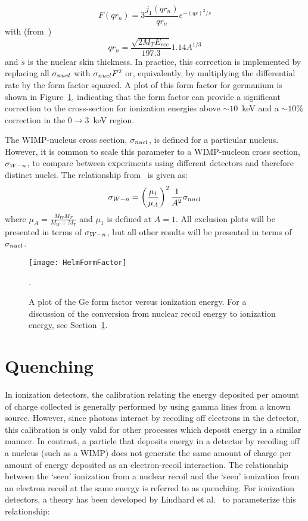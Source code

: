 		\begin{equation}
			F (q r_{n}) = 3 \frac{j_{1}(q r_{n})}{q r_{n}} e^{-(q s)^{2}/s}
			\label{eqn:WSHelmFF}
		\end{equation}
with (from~\cite{Lew96})
		\[
			q r_{n} = \frac{\sqrt{2  M_{T} E_{rec}}}{197.3} 1.14 A^{1/3}
		\]
and $s$ is the nuclear skin thickness.  In practice, this correction is implemented by replacing all $\sigma_{nucl}$ with $\sigma_{nucl} F^{2}$ or, equivalently, by multiplying the differential rate by the form factor squared.  A plot of this form factor for germanium is shown in Figure~\ref{fig:HelmFF}, indicating that the form factor can provide a significant correction to the cross-section for ionization energies above $\sim10$~keV and a $\sim10$\% correction in the 0$\to$3~keV region.  

The WIMP-nucleus cross section, $\sigma_{nucl}$, is defined for a particular nucleus.  However, it is common to scale this parameter to a WIMP-nucleon cross section, $\sigma_{W-n}$, to compare between experiments using different detectors and therefore distinct nuclei.  The relationship from~\cite{Alner2005444} is given as: 
		\begin{equation}
			\sigma_{W-n} = \left( \frac{\mu_{1}}{\mu_{A}} \right)^{2}\frac{1}{A^{2}} \sigma_{nucl} 
			\label{eqn:SigmaConversion}
		\end{equation}
where $\mu_{A} = \frac{M_{W} M_{T}}{M_{W} + M_{T}}$ and $\mu_{1}$ is defined at $A=1$.  All exclusion plots will be presented in terms of $\sigma_{W-n}$, but all other results will be presented in terms of $\sigma_{nucl}$.

		\begin{figure}
			\centering
			\texttt{[image: HelmFormFactor]}
			\caption[A plot of the Ge form factor versus ionization energy]
			{A plot of the Ge form factor versus ionization energy.  For a discussion of the 
			conversion from nuclear recoil energy to ionization energy, see 
			Section~\ref{sec:ResultsQuenching}.}
			\label{fig:HelmFF}.
		\end{figure}
	\section{Quenching}
	\label{sec:ResultsQuenching}
In ionization detectors, the calibration relating the energy deposited per
amount of charge collected is generally performed by using gamma lines from a
known source.  However, since photons interact by recoiling off electrons in
the detector, this calibration is only valid for other processes which deposit
energy in a similar manner.  In contrast, a particle that deposits energy in a
detector by recoiling off a nucleus (such as a WIMP) does not
generate the same amount of charge per amount of energy deposited as an
electron-recoil interaction.  The relationship between the `seen' ionization
from a nuclear recoil and the `seen' ionization from an electron recoil at the
same energy is referred to as quenching.  For ionization detectors, a theory
has been developed by Lindhard et al.~\cite{Lindhard:1961fa} to parameterize
this relationship:

